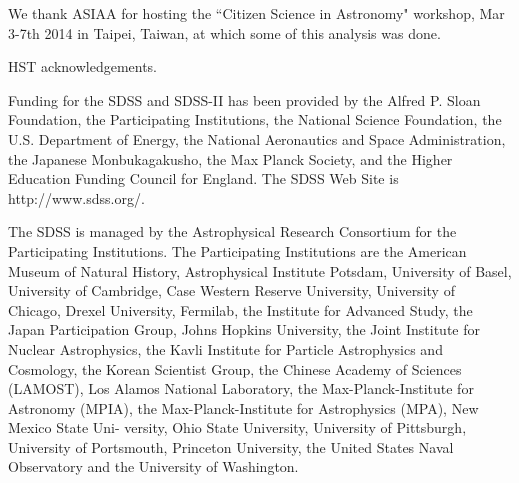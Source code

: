 \documentclass[usenatbib]{mn2e}
\begin{document}
We thank ASIAA for hosting the ``Citizen Science in Astronomy" workshop, Mar 3-7th 2014 in Taipei, Taiwan, at which some of this analysis was done. 

HST acknowledgements.

Funding for the SDSS and SDSS-II has been provided by the Alfred P. Sloan Foundation, the Participating Institutions, the National Science Foundation, the U.S. Department of Energy, the National Aeronautics and Space Administration, the Japanese Monbukagakusho, the Max Planck Society, and the Higher Education Funding Council for England. The SDSS Web Site is http://www.sdss.org/. 

The SDSS is managed by the Astrophysical Research Consortium for the Participating Institutions. The Participating Institutions are the American Museum of Natural History, Astrophysical  Institute Potsdam, University of Basel, University of Cambridge, 
Case Western Reserve University, University of Chicago, Drexel University, Fermilab, the Institute for Advanced Study, the Japan 
Participation Group, Johns Hopkins University, the Joint Institute for Nuclear Astrophysics, the Kavli Institute for Particle Astrophysics and Cosmology, the Korean Scientist Group, the Chinese Academy of Sciences (LAMOST), Los Alamos National Laboratory, the Max-Planck-Institute for Astronomy (MPIA), the Max-Planck-Institute for Astrophysics (MPA), New Mexico State Uni- 
versity, Ohio State University, University of Pittsburgh, University of Portsmouth, Princeton University, the United States Naval Observatory and the University of Washington. 



\end{document}
